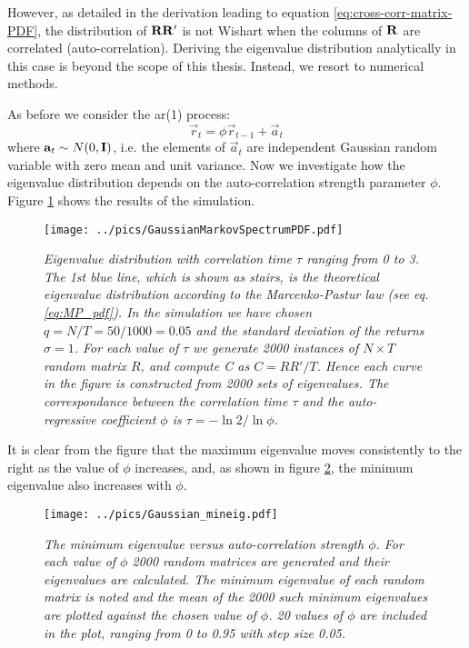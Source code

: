 However, as detailed in the derivation leading to equation
\ref{eq:cross-corr-matrix-PDF}, the distribution of $\mathbf{RR'}$ is not
Wishart when the columns of $\mathbf{R}$ are correlated
(auto-correlation). Deriving the eigenvalue distribution analytically
in this case is beyond the scope of this thesis. Instead, we resort to
numerical methods.

As before we consider the \gls{ar}(1) process:
\begin{equation*}
  \vec{r}_t = \phi \vec{r}_{t-1} + \vec{a}_{t}
\end{equation*}
where $\mathbf{a}_t \sim N(0, \mathbf{I})$, i.e. the elements of $\vec{a}_t$ are
independent Gaussian random variable with zero mean and unit
variance. Now we investigate how the eigenvalue distribution depends on
the auto-correlation strength parameter $\phi$. Figure
\ref{fig:GaussianMarkovSpectrumPDF} shows the results of the
simulation.
\begin{figure}[htb!]
  \begin{center}
    \texttt{[image: ../pics/GaussianMarkovSpectrumPDF.pdf]}
  \end{center}
  \vspace{-10mm}
  \caption{\small \it
      Eigenvalue distribution with correlation time $\tau$ ranging
      from 0 to 3. The 1st blue line, which is shown as stairs, is the
      theoretical eigenvalue distribution according to the
      Marcenko-Pastur law (see eq.\ref{eq:MP_pdf}). In the simulation
      we have chosen $q = N/T = 50/1000 = 0.05$ and the standard
      deviation of the returns $\sigma=1$. For each value of $\tau$ we
      generate 2000 instances of $N \times T$ random matrix $R$, and
      compute C as $C=RR'/T$. Hence each curve in the figure is
      constructed from 2000 sets of eigenvalues. The correspondance
      between the correlation time $\tau$ and the auto-regressive
      coefficient $\phi$ is $\tau = -\ln 2 / \ln \phi$.
    }
  \label{fig:GaussianMarkovSpectrumPDF}
\end{figure}
It is clear from the figure that the maximum eigenvalue moves
consistently to the right as the value of $\phi$ increases, and, as
shown in figure \ref{fig:Gaussian_mineig}, the minimum eigenvalue
also increases with $\phi$.
\begin{figure}[htb!]
  \centering
  \texttt{[image: ../pics/Gaussian\_mineig.pdf]}
  \caption{\small \it The minimum eigenvalue versus
    auto-correlation strength $\phi$. For each value of $\phi$ 2000
    random matrices are generated and their eigenvalues are
    calculated. The minimum eigenvalue of each random matrix is noted
    and the mean of the 2000 such minimum eigenvalues are plotted
    against the chosen value of $\phi$. 20 values of $\phi$ are
    included in the plot, ranging from 0 to 0.95 with step size 0.05.}
  \label{fig:Gaussian_mineig}
\end{figure}

